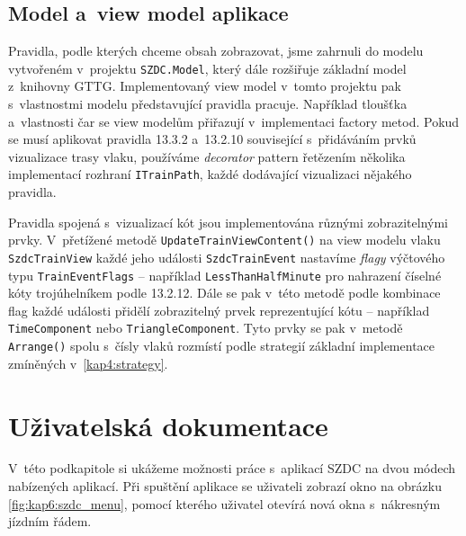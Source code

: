 \subsection*{Model a~view model aplikace}
Pravidla, podle kterých chceme obsah zobrazovat, jsme zahrnuli do modelu vytvořeném v~projektu \texttt{SZDC.Model}, který dále rozšiřuje základní model \linebreak z~knihovny GTTG. Implementovaný view model v~tomto projektu pak s~vlastnostmi modelu představující pravidla pracuje. Například tloušťka a~vlastnosti čar se view modelům přiřazují v~implementaci factory metod. Pokud se musí aplikovat pravidla 13.3.2 a~13.2.10 související s~přidáváním prvků vizualizace trasy vlaku, používáme \textit{decorator} pattern řetězením několika implementací rozhraní \texttt{ITrainPath}, každé dodávající vizualizaci nějakého pravidla.

Pravidla spojená s~vizualizací kót jsou implementována různými zobrazitelnými prvky. V~přetížené metodě \texttt{UpdateTrainViewContent()} na view modelu \linebreak vlaku \texttt{SzdcTrainView} každé jeho události \texttt{SzdcTrainEvent} nastavíme \textit{flagy} \linebreak výčtového typu \texttt{TrainEventFlags} -- například \texttt{LessThanHalfMinute} pro nahrazení číselné kóty trojúhelníkem podle 13.2.12. Dále se pak v~této metodě podle kombinace flag každé události přidělí zobrazitelný prvek reprezentující kótu -- například \texttt{TimeComponent} nebo \texttt{TriangleComponent}. Tyto prvky se pak v~metodě \texttt{Arrange()} spolu s~čísly vlaků rozmístí podle strategií základní implementace zmíněných v~\ref{kap4:strategy}.

\section{Uživatelská dokumentace}
\label{kap6:szdc:user_doc}
V~této podkapitole si ukážeme možnosti práce s~aplikací SZDC na dvou módech nabízených aplikací. Při spuštění aplikace se uživateli zobrazí okno na obrázku \ref{fig:kap6:szdc_menu}, pomocí kterého uživatel otevírá nová okna s~nákresným jízdním řádem.

